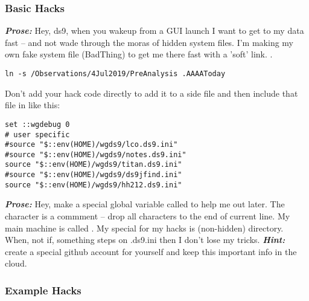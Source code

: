 \subsubsection{Basic Hacks}

\textbf{\emph{Prose:}} Hey, ds9, when you wakeup from a GUI
launch I want to get to my data fast -- and not wade through
the moras of hidden system files. I'm making my own fake
system file (BadThing\texttrademark) to get me there fast
with a 'soft' link. .

\begingroup \fontsize{10pt}{10pt}
\selectfont
\begin{verbatim} 
ln -s /Observations/4Jul2019/PreAnalysis .AAAAToday
\end{verbatim}
\endgroup


Don't add your hack code directly to  add it to a
side file and then include that file in  like
 this:


\begingroup \fontsize{10pt}{10pt}
\selectfont
\begin{verbatim} 
set ::wgdebug 0
# user specific
#source "$::env(HOME)/wgds9/lco.ds9.ini"
#source "$::env(HOME)/wgds9/notes.ds9.ini"
source "$::env(HOME)/wgds9/titan.ds9.ini"
#source "$::env(HOME)/wgds9/ds9jfind.ini"
source "$::env(HOME)/wgds9/hh212.ds9.ini"
\end{verbatim}
\endgroup

\textbf{\emph{Prose:}} Hey, make a special global variable called
 to help me out later. The \dhl{\#} character is a
commment -- drop all characters to the end of current line. My main
machine is called . My special  for my hacks
is  (non-hidden) directory. When, not if, something steps
on .ds9.ini then I don't lose my tricks. \textbf{\emph{Hint:}} create
a special github account for yourself and keep this important info in
the cloud.

\subsubsection{Example Hacks}

